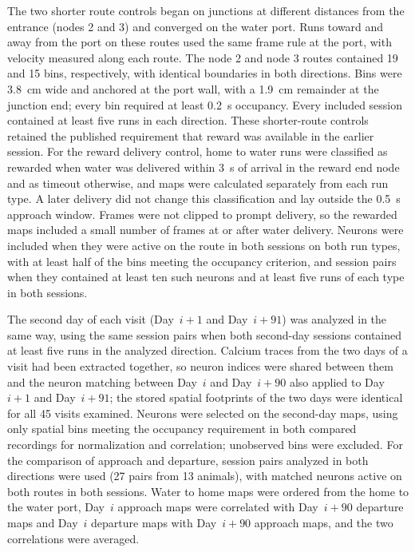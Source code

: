 \documentclass[fleqn,10pt]{wlscirep}
\begin{document}
The two shorter route controls began on junctions at different distances from the entrance (nodes 2 and 3) and converged on the water port. Runs toward and away from the port on these routes used the same frame rule at the port, with velocity measured along each route. The node 2 and node 3 routes contained 19 and 15 bins, respectively, with identical boundaries in both directions. Bins were 3.8~cm wide and anchored at the port wall, with a 1.9~cm remainder at the junction end; every bin required at least 0.2~s occupancy. Every included session contained at least five runs in each direction. These shorter-route controls retained the published requirement that reward was available in the earlier session. For the reward delivery control, home to water runs were classified as rewarded when water was delivered within 3~s of arrival in the reward end node and as timeout otherwise, and maps were calculated separately from each run type. A later delivery did not change this classification and lay outside the 0.5~s approach window. Frames were not clipped to prompt delivery, so the rewarded maps included a small number of frames at or after water delivery. Neurons were included when they were active on the route in both sessions on both run types, with at least half of the bins meeting the occupancy criterion, and session pairs when they contained at least ten such neurons and at least five runs of each type in both sessions.

The second day of each visit (Day~$i+1$ and Day~$i+91$) was analyzed in the same way, using the same session pairs when both second-day sessions contained at least five runs in the analyzed direction. Calcium traces from the two days of a visit had been extracted together, so neuron indices were shared between them and the neuron matching between Day~$i$ and Day~$i+90$ also applied to Day~$i+1$ and Day~$i+91$; the stored spatial footprints of the two days were identical for all 45 visits examined. Neurons were selected on the second-day maps, using only spatial bins meeting the occupancy requirement in both compared recordings for normalization and correlation; unobserved bins were excluded. For the comparison of approach and departure, session pairs analyzed in both directions were used (27 pairs from 13 animals), with matched neurons active on both routes in both sessions. Water to home maps were ordered from the home to the water port, Day~$i$ approach maps were correlated with Day~$i+90$ departure maps and Day~$i$ departure maps with Day~$i+90$ approach maps, and the two correlations were averaged.
\end{document}
